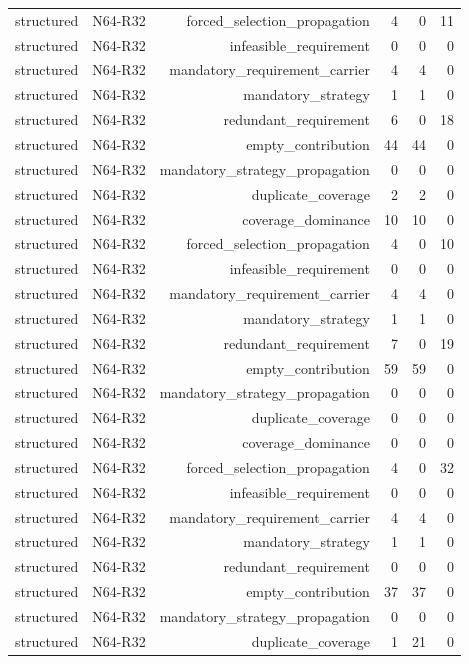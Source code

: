 {\begin{longtable}{lrrrrr}
structured & N64-R32 & forced\_selection\_propagation & 4 & 0 & 11 \\
structured & N64-R32 & infeasible\_requirement & 0 & 0 & 0 \\
structured & N64-R32 & mandatory\_requirement\_carrier & 4 & 4 & 0 \\
structured & N64-R32 & mandatory\_strategy & 1 & 1 & 0 \\
structured & N64-R32 & redundant\_requirement & 6 & 0 & 18 \\
structured & N64-R32 & empty\_contribution & 44 & 44 & 0 \\
structured & N64-R32 & mandatory\_strategy\_propagation & 0 & 0 & 0 \\
structured & N64-R32 & duplicate\_coverage & 2 & 2 & 0 \\
structured & N64-R32 & coverage\_dominance & 10 & 10 & 0 \\
structured & N64-R32 & forced\_selection\_propagation & 4 & 0 & 10 \\
structured & N64-R32 & infeasible\_requirement & 0 & 0 & 0 \\
structured & N64-R32 & mandatory\_requirement\_carrier & 4 & 4 & 0 \\
structured & N64-R32 & mandatory\_strategy & 1 & 1 & 0 \\
structured & N64-R32 & redundant\_requirement & 7 & 0 & 19 \\
structured & N64-R32 & empty\_contribution & 59 & 59 & 0 \\
structured & N64-R32 & mandatory\_strategy\_propagation & 0 & 0 & 0 \\
structured & N64-R32 & duplicate\_coverage & 0 & 0 & 0 \\
structured & N64-R32 & coverage\_dominance & 0 & 0 & 0 \\
structured & N64-R32 & forced\_selection\_propagation & 4 & 0 & 32 \\
structured & N64-R32 & infeasible\_requirement & 0 & 0 & 0 \\
structured & N64-R32 & mandatory\_requirement\_carrier & 4 & 4 & 0 \\
structured & N64-R32 & mandatory\_strategy & 1 & 1 & 0 \\
structured & N64-R32 & redundant\_requirement & 0 & 0 & 0 \\
structured & N64-R32 & empty\_contribution & 37 & 37 & 0 \\
structured & N64-R32 & mandatory\_strategy\_propagation & 0 & 0 & 0 \\
structured & N64-R32 & duplicate\_coverage & 1 & 21 & 0 \\

\end{longtable}}
